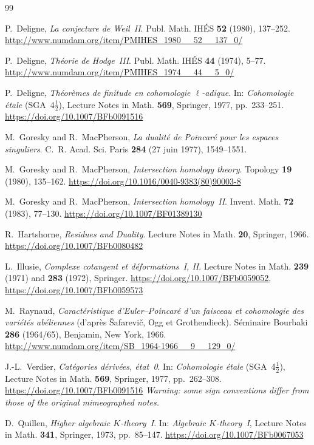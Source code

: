 \documentclass[12pt,oneside]{amsbook}
\theoremstyle{plain}
\theoremstyle{definition}
\begin{document}
\backmatter

\renewcommand{\bibname}{Bibliography}
\begin{thebibliography}{99}

 P.~Deligne, \emph{La conjecture de Weil~II}. Publ. Math. IHÉS \textbf{52} (1980), 137--252. \newblock\url{http://www.numdam.org/item/PMIHES_1980__52__137_0/}

 P.~Deligne, \emph{Théorie de Hodge~III}. Publ. Math. IHÉS \textbf{44} (1974), 5--77. \newblock\url{http://www.numdam.org/item/PMIHES_1974__44__5_0/}

 P.~Deligne, \emph{Théorèmes de finitude en cohomologie $\ell$-adique}. In: \emph{Cohomologie étale} (SGA~4$\frac{1}{2}$), Lecture Notes in Math. \textbf{569}, Springer, 1977, pp.~233--251. \newblock\url{https://doi.org/10.1007/BFb0091516}

 M.~Goresky and R.~MacPherson, \emph{La dualité de Poincaré pour les espaces singuliers}. C.~R. Acad. Sci. Paris \textbf{284} (27 juin 1977), 1549--1551.

 M.~Goresky and R.~MacPherson, \emph{Intersection homology theory}. Topology \textbf{19} (1980), 135--162. \newblock\url{https://doi.org/10.1016/0040-9383(80)90003-8}

 M.~Goresky and R.~MacPherson, \emph{Intersection homology~II}.
Invent. Math. \textbf{72} (1983), 77--130. \newblock\url{https://doi.org/10.1007/BF01389130}

 R.~Hartshorne, \emph{Residues and Duality}. Lecture Notes in Math. \textbf{20}, Springer, 1966. \newblock\url{https://doi.org/10.1007/BFb0080482}

 L.~Illusie, \emph{Complexe cotangent et déformations~I, II}. Lecture Notes in Math. \textbf{239} (1971) and \textbf{283} (1972), Springer. \newblock\url{https://doi.org/10.1007/BFb0059052}, \url{https://doi.org/10.1007/BFb0059573}

 M.~Raynaud, \emph{Caractéristique d'Euler--Poincaré d'un faisceau et cohomologie des variétés abéliennes} (d'après Šafarevič, Ogg et Grothendieck). Séminaire Bourbaki \textbf{286} (1964/65), Benjamin, New York, 1966. \newblock\url{http://www.numdam.org/item/SB_1964-1966__9__129_0/}

 J.-L.~Verdier, \emph{Catégories dérivées, état~0}. In: \emph{Cohomologie étale} (SGA~4$\frac{1}{2}$), Lecture Notes in Math. \textbf{569}, Springer, 1977, pp.~262--308. \newblock\url{https://doi.org/10.1007/BFb0091516} \newblock\emph{Warning: some sign conventions differ from those of the original mimeographed notes.}

 D.~Quillen, \emph{Higher algebraic $K$-theory~I}. In: \emph{Algebraic $K$-theory~I}, Lecture Notes in Math. \textbf{341}, Springer, 1973, pp.~85--147. \newblock\url{https://doi.org/10.1007/BFb0067053}

\end{thebibliography}
\end{document}
